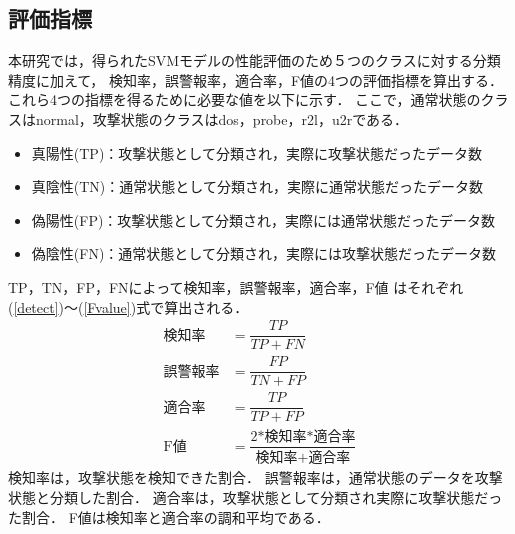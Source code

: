 \subsection{評価指標}
本研究では，得られたSVMモデルの性能評価のため５つのクラスに対する分類精度に加えて，
検知率，誤警報率，適合率，F値の4つの評価指標を算出する．
これら4つの指標を得るために必要な値を以下に示す．
ここで，通常状態のクラスはnormal，攻撃状態のクラスはdos，probe，r2l，u2rである．
\begin{itemize}
    \item 真陽性(TP)：攻撃状態として分類され，実際に攻撃状態だったデータ数
    \item 真陰性(TN)：通常状態として分類され，実際に通常状態だったデータ数
    \item 偽陽性(FP)：攻撃状態として分類され，実際には通常状態だったデータ数
    \item 偽陰性(FN)：通常状態として分類され，実際には攻撃状態だったデータ数
\end{itemize}
TP，TN，FP，FNによって検知率，誤警報率，適合率，F値
はそれぞれ(\ref{detect})〜(\ref{Fvalue})式で算出される．
\setlength{\jot}{15pt}
\begin{align}
\text{検知率} &= \dfrac{TP}{TP + FN}\label{detect}\\
\text{誤警報率} &= \dfrac{FP}{TN + FP}\\
\text{適合率} &= \dfrac{TP}{TP + FP}\\
\text{F値} &= \dfrac{2\text{*検知率*適合率}}{\text{検知率}+\text{適合率}}\label{Fvalue}
\end{align}
検知率は，攻撃状態を検知できた割合．
誤警報率は，通常状態のデータを攻撃状態と分類した割合．
適合率は，攻撃状態として分類され実際に攻撃状態だった割合．
F値は検知率と適合率の調和平均である．
